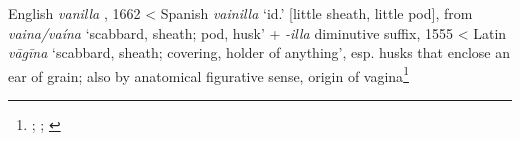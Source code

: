 \begin{etymology}\label{ety:vanilla}
English \textit{vanilla }, 1662
< Spanish \textit{vainilla} `id.' [little sheath, little pod], from \textit{vaina/vaína} `scabbard, sheath; pod, husk' + \textit{-illa} diminutive suffix, 1555
< Latin \textit{vāgīna} `scabbard, sheath; covering, holder of anything', esp. husks that enclose an ear of grain; also by anatomical figurative sense, origin of vagina\footnote{\textcite[vanilla]{oed}; \textcites[538]{gomez_de_silva_elseviers_1985}[596]{corominas_breve_1987}; \textcite[vāgīna]{lewis_latin_1879}}
\end{etymology}